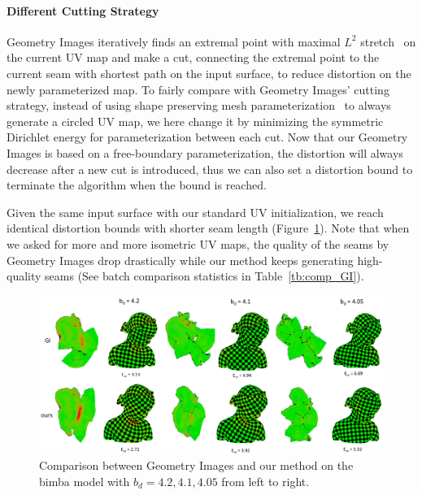 \paragraph{Different Cutting Strategy}
Geometry Images iteratively finds an extremal point with maximal $L^2$ stretch~\cite{} on the current UV map and make a cut, connecting the extremal point to the current seam with shortest path on the input surface, to reduce distortion on the newly parameterized map. To fairly compare with Geometry Images' cutting strategy, instead of using shape preserving mesh parameterization~\cite{} to always generate a circled UV map, we here change it by minimizing the symmetric Dirichlet energy for parameterization between each cut. Now that our Geometry Images is based on a free-boundary parameterization, the distortion will always decrease after a new cut is introduced, thus we can also set a distortion bound to terminate the algorithm when the bound is reached.

Given the same input surface with our standard UV initialization, we reach identical distortion bounds with shorter seam length (Figure~\ref{fig:comp_GI}). Note that when we asked for more and more isometric UV maps, the quality of the seams by Geometry Images drop drastically while our method keeps generating high-quality seams (See batch comparison statistics in Table~\ref{tb:comp_GI}).

\begin{figure}[!h]
\centering
\includegraphics[width=\linewidth]{fig/comp_GI.png}
\caption{Comparison between Geometry Images and our method on the bimba model with $b_d = 4.2, 4.1, 4.05$ from left to right.}
\label{fig:comp_GI}
\end{figure}

